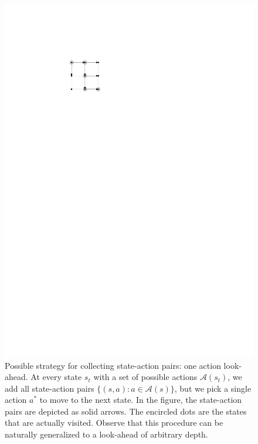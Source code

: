 \documentclass[a4paper]{article}
\theoremstyle{definition}
\theoremstyle{plain}
\begin{document}
\begin{figure}
  \centering
  \includegraphics[scale=1.2]{figures/network/state_action_collection}
  \caption{Possible strategy for collecting state-action pairs: one action
    look-ahead. At every state $s_{t}$ with a set of possible actions
    $\mathcal{A}(s_{t})$, we add all state-action pairs
    $\{ (s, a) : a \in \mathcal{A}(s) \}$, but we pick a single action $a^{*}$
    to move to the next state. In the figure, the state-action pairs are
    depicted as solid arrows. The encircled dots are the states that are
    actually visited. Observe that this procedure can be naturally generalized
    to a look-ahead of arbitrary depth.}
  \label{fig:state_action_collection}
\end{figure}
\end{document}
